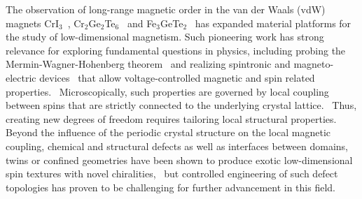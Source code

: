 \documentclass[aps,prl,showpacs,twocolumn,superscriptaddress,floatfix]{revtex4-2}
\begin{document}

The observation of long-range magnetic order in the van der Waals (vdW) magnets CrI$_3$~\cite{huang_layer-dependent_2017}, Cr$_2$Ge$_2$Te$_6$~\cite{gong_discovery_2017} and Fe$_3$GeTe$_2$~\cite{deng_gate-tunable_2018} has expanded material platforms for the study of low-dimensional magnetism. Such pioneering work has strong relevance for exploring fundamental questions in physics, including probing the Mermin-Wagner-Hohenberg theorem~\cite{mermin_absence_1966,Hohenberg.1967} and realizing spintronic and magneto-electric devices~\cite{Song.2018,Kim.2018,Wang.2018,Klein.2018,Jiang.2019,Song.2019} that allow voltage-controlled magnetic and spin related properties.~\cite{deng_gate-tunable_2018,huang_electrical_2018,jiang_electric-field_2018,Jiang_doping_2018} Microscopically, such properties are governed by local coupling between spins that are strictly connected to the underlying crystal lattice.~\cite{Muhlbauer.2009,Yu.2010} Thus, creating new degrees of freedom requires tailoring local structural properties.~\cite{Romming.2013} Beyond the influence of the periodic crystal structure on the local magnetic coupling, chemical and structural defects as well as interfaces between domains, twins or confined geometries have been shown to produce exotic low-dimensional spin textures with novel chiralities,~\cite{Yu.2010b,Li.2017,Matsumoto.2016,Jin.2017} but controlled engineering of such defect topologies has proven to be challenging for further advancement in this field.~\cite{Duine.2018}
\end{document}
